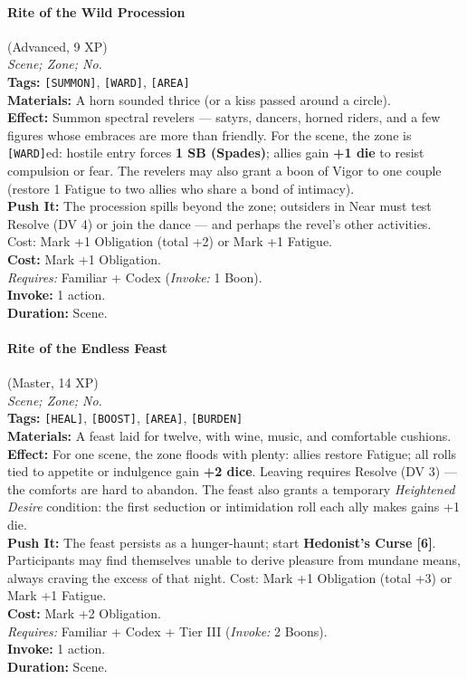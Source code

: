 \paragraph{Rite of the Wild Procession} (Advanced, 9 XP) \hfill \\
\emph{Scene; Zone; No.} \\
\textbf{Tags:} \texttt{[SUMMON]}, \texttt{[WARD]}, \texttt{[AREA]} \\
\textbf{Materials:} A horn sounded thrice (or a kiss passed around a circle). \\
\textbf{Effect:} Summon spectral revelers --- satyrs, dancers, horned riders, and a few figures whose embraces are more than friendly. For the scene, the zone is \texttt{[WARD]}ed: hostile entry forces \textbf{1 SB (Spades)}; allies gain \textbf{+1 die} to resist compulsion or fear. The revelers may also grant a boon of Vigor to one couple (restore 1 Fatigue to two allies who share a bond of intimacy). \\
\textbf{Push It:} The procession spills beyond the zone; outsiders in Near must test Resolve (DV 4) or join the dance --- and perhaps the revel's other activities. Cost: Mark +1 Obligation (total +2) or Mark +1 Fatigue. \\
\textbf{Cost:} Mark +1 Obligation. \\
\textit{Requires:} Familiar + Codex (\textit{Invoke:} 1 Boon). \\
\textbf{Invoke:} 1 action. \\
\textbf{Duration:} Scene.

\paragraph{Rite of the Endless Feast} (Master, 14 XP) \hfill \\
\emph{Scene; Zone; No.} \\
\textbf{Tags:} \texttt{[HEAL]}, \texttt{[BOOST]}, \texttt{[AREA]}, \texttt{[BURDEN]} \\
\textbf{Materials:} A feast laid for twelve, with wine, music, and comfortable cushions. \\
\textbf{Effect:} For one scene, the zone floods with plenty: allies restore Fatigue; all rolls tied to appetite or indulgence gain \textbf{+2 dice}. Leaving requires Resolve (DV 3) --- the comforts are hard to abandon. The feast also grants a temporary \textit{Heightened Desire} condition: the first seduction or intimidation roll each ally makes gains +1 die. \\
\textbf{Push It:} The feast persists as a hunger-haunt; start \textbf{Hedonist's Curse [6]}. Participants may find themselves unable to derive pleasure from mundane means, always craving the excess of that night. Cost: Mark +1 Obligation (total +3) or Mark +1 Fatigue. \\
\textbf{Cost:} Mark +2 Obligation. \\
\textit{Requires:} Familiar + Codex + Tier III (\textit{Invoke:} 2 Boons). \\
\textbf{Invoke:} 1 action. \\
\textbf{Duration:} Scene.

